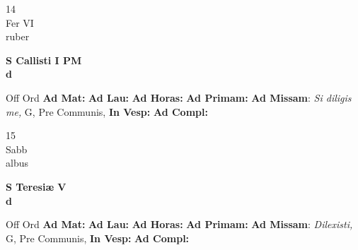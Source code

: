\documentclass[10pt, openany]{book}
\begin{document}
    \begin{center}
        \begin{minipage}{3.5in}
            \vspace{2em}
            \begin{minipage}{0.5in}
                {\Huge 14} \\
                {\normalsize Fer VI} \\
                {\normalsize ruber}
            \end{minipage}
            \begin{minipage}{3.0in}
                \textbf{ \large S Callisti I PM \\
                \textnormal{\normalsize d}} \\ 
            \end{minipage}
            \begin{justify}Off Ord
                \textbf{Ad Mat: }
                \textbf{Ad Lau: }
                \textbf{Ad Horas: }
                \textbf{Ad Primam: }\textbf{Ad Missam}: \textit{Si diligis me,} G, Pre Communis,  
                \textbf{In Vesp: }
                \textbf{Ad Compl: }
            \end{justify}
        \end{minipage}
    \end{center}

    \begin{center}
        \begin{minipage}{3.5in}
            \vspace{2em}
            \begin{minipage}{0.5in}
                {\Huge 15} \\
                {\normalsize Sabb} \\
                {\normalsize albus}
            \end{minipage}
            \begin{minipage}{3.0in}
                \textbf{ \large S Teresiæ V \\
                \textnormal{\normalsize d}} \\ 
            \end{minipage}
            \begin{justify}Off Ord
                \textbf{Ad Mat: }
                \textbf{Ad Lau: }
                \textbf{Ad Horas: }
                \textbf{Ad Primam: }\textbf{Ad Missam}: \textit{Dilexisti,} G, Pre Communis,  
                \textbf{In Vesp: }
                \textbf{Ad Compl: }
            \end{justify}
        \end{minipage}
    \end{center}
\end{document}
